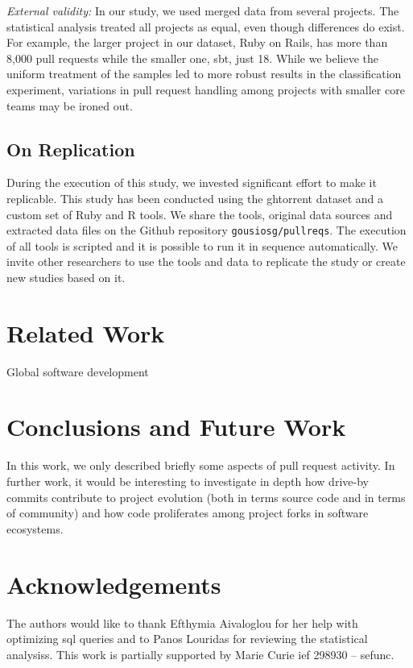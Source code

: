 \documentclass{sig-alternate}
\begin{document}
\emph{External validity:}
In our study, we used merged data from several projects. The statistical
analysis treated all projects as equal, even though differences do exist.
For example, the larger project in our dataset, Ruby on Rails, 
has more than 8,000 pull requests while the smaller one, \textsf{sbt}, just 18.
While we believe the uniform treatment of the samples led to more robust
results in the classification experiment, variations in pull request
handling among projects with smaller core teams may be ironed out.

\subsection{On Replication}

During the execution of this study, we invested significant effort to
make it replicable.  This study has been conducted using the {\sc ght}orrent dataset
and a custom set of Ruby and R tools. We share the tools, original data sources
and extracted data files on the Github repository \texttt{gousiosg/pullreqs}.
The execution of all tools is scripted and it is possible to run it
in sequence automatically. We invite other researchers to use the tools and data
to replicate the study or create new studies based on it.

\section{Related Work}

\cite{Bird09}
\cite{Cornf10}
\cite{Dabbi12}
\cite{Bird12}
\cite{Barr12}
\cite{Buffe99}
\cite{Mens02}
\cite{Shiha12}

Global software development
\section{Conclusions and Future Work}

In this work, we only described briefly some aspects of pull request activity.
In further work, it would be interesting to investigate in depth how drive-by
commits contribute to project evolution (both in terms source code and in
terms of community) and how code proliferates among project
forks in software ecosystems.

\section*{Acknowledgements}

The authors would like to thank Efthymia Aivaloglou for her help with 
optimizing {\sc sql} queries and to Panos Louridas for reviewing the 
statistical analysiss.
This work is partially supported by Marie Curie {\sc ief} 298930 -- {\sc sefunc}.



\end{document}
